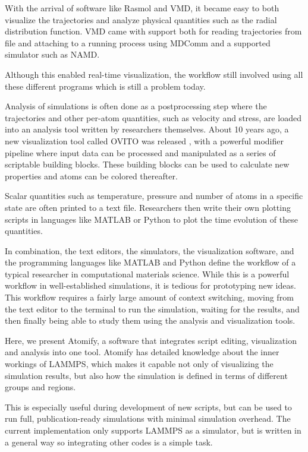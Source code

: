 \documentclass[12pt,a4paper,final]{iopart}
\begin{document}
With the arrival of software like Rasmol\cite{sayle1995rasmol} and VMD\cite{Humphrey1996Vmd},
it became easy to both visualize the trajectories and analyze physical quantities such as the radial distribution function.
VMD came with support both for reading trajectories from file and attaching to a
running process using MDComm\cite{nelson1995mdscope} and a supported simulator such as NAMD.

Although this enabled real-time visualization, the workflow still involved using all these different programs which is still a problem today.

Analysis of simulations is often done as a postprocessing step where the trajectories and other 
per-atom quantities, such as velocity and stress, are loaded into an analysis tool written by researchers themselves.
About 10 years ago, a new visualization tool called OVITO was released \cite{Stukowski2009Visualization},
with a powerful modifier pipeline where input data can be processed and manipulated as a series of scriptable building blocks.
These building blocks can be used to calculate new properties and atoms can be colored thereafter.

Scalar quantities such as temperature, pressure and number of atoms in a specific state are often printed to a
text file. Researchers then write their own plotting scripts in languages like MATLAB or Python
to plot the time evolution of these quantities. 

In combination, the text editors, the simulators, the visualization software, and the programming
languages like MATLAB and Python define the workflow of a typical researcher in computational
materials science.
While this is a powerful workflow in well-established simulations,
it is tedious for prototyping new ideas.
This workflow requires a fairly large amount of context switching,
moving from the text editor to the terminal to run the simulation,
waiting for the results, and then finally being able to study them using the analysis
and visualization tools.

Here, we present Atomify, a software that integrates script editing,
visualization and analysis into one tool.
Atomify has detailed knowledge about the inner workings of LAMMPS,
which makes it capable not only of visualizing the simulation results,
but also how the simulation is defined in terms of different groups and regions.

This is especially useful during development of new scripts, but can be used
to run full, publication-ready simulations with minimal simulation overhead.
The current implementation only supports LAMMPS as a simulator, but is written in a general
way so integrating other codes is a simple task.
\end{document}
